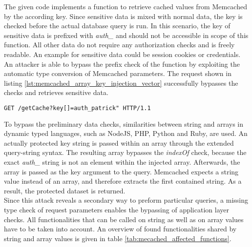The given code implements a function to retrieve cached values from Memcached by the according key. Since sensitive data is mixed with normal data, the key is checked before the actual database query is run. In this scenario, the key of sensitive data is prefixed with \emph{auth\_} and should not be accessible in scope of this function. All other data do not require any authorization checks and is freely readable. An example for sensitive data could be session cookies or credentials. An attacker is able to bypass the prefix check of the function by exploiting the automatic type conversion of Memcached parameters. The request shown in listing \ref{lst:memcached_array_key_injection_vector} successfully bypasses the checks and retrieves sensitive data. \\

\begin{lstlisting}[caption={Attack vectors against Memcached for array key injection via the query-string parameter}, label={lst:memcached_array_key_injection_vector}]
GET /getCache?key[]=auth_patrick" HTTP/1.1
\end{lstlisting}

To bypass the preliminary data checks, similarities between string and arrays in dynamic typed languages, such as NodeJS, PHP, Python and Ruby, are used. An actually protected key string is passed within an array through the extended query-string syntax. The resulting array bypasses the \emph{indexOf} check, because the exact \emph{auth\_} string is not an element within the injected array. Afterwards, the array is passed as the key argument to the query. Memcached expects a string value instead of an array, and therefore extracts the first contained string. As a result, the protected dataset is returned.\\

Since this attack reveals a secondary way to preform particular queries, a missing type check of request parameters enables the bypassing of application layer checks. All functionalities that can be called on string as well as on array values have to be taken into account. An overview of found functionalities shared by string and array values is given in table \ref{tab:mecached_affected_functions}.

